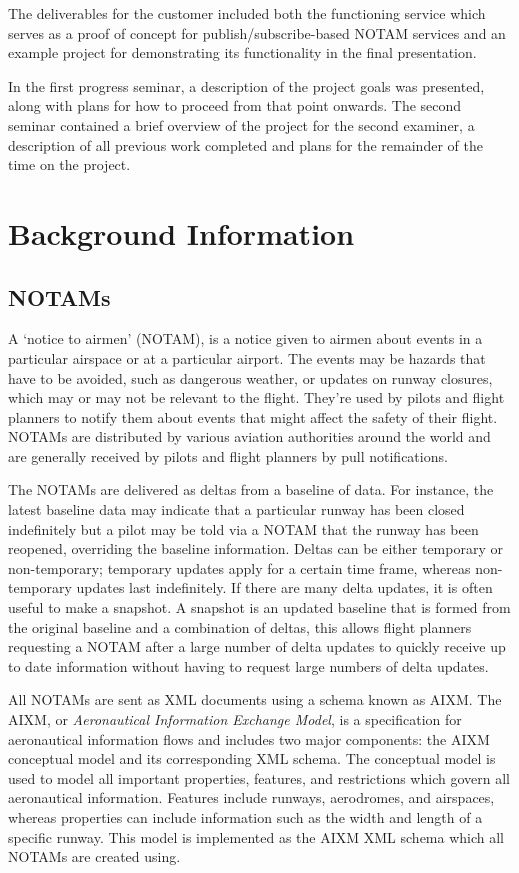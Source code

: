 \documentclass[a4paper, 12pt, twoside]{article}
\begin{document}
The deliverables for the customer included both the functioning service which serves as a proof of concept for publish/subscribe-based NOTAM services and an example project for demonstrating its functionality in the final presentation.

In the first progress seminar, a description of the project goals was presented, along with plans for how to proceed from that point onwards. The second seminar contained a brief overview of the project for the second examiner, a description of all previous work completed and plans for the remainder of the time on the project.

\section{Background Information}

\subsection{NOTAMs}
\label{sec:bg_notams}
A `notice to airmen' (NOTAM), is a notice given to airmen about events in a particular airspace or at a particular airport. The events may be hazards that have to be avoided, such as dangerous weather, or updates on runway closures, which may or may not be relevant to the flight. They're used by pilots and flight planners to notify them about events that might affect the safety of their flight. NOTAMs are distributed by various aviation authorities around the world and are generally received by pilots and flight planners by pull notifications.

The NOTAMs are delivered as deltas from a baseline of data. For instance, the latest baseline data may indicate that a particular runway has been closed indefinitely but a pilot may be told via a NOTAM that the runway has been reopened, overriding the baseline information. Deltas can be either temporary or non-temporary; temporary updates apply for a certain time frame, whereas non-temporary updates last indefinitely. If there are many delta updates, it is often useful to make a snapshot. A snapshot is an updated baseline that is formed from the original baseline and a combination of deltas, this allows flight planners requesting a NOTAM after a large number of delta updates to quickly receive up to date information without having to request large numbers of delta updates.

All NOTAMs are sent as XML documents using a schema known as AIXM. The AIXM, or \emph{Aeronautical Information Exchange Model}, is a specification for aeronautical information flows and includes two major components: the AIXM conceptual model and its corresponding XML schema. The conceptual model is used to model all important properties, features, and restrictions which govern all aeronautical information. Features include runways, aerodromes, and airspaces, whereas properties can include information such as the width and length of a specific runway. This model is implemented as the AIXM XML schema which all NOTAMs are created using.
\end{document}
